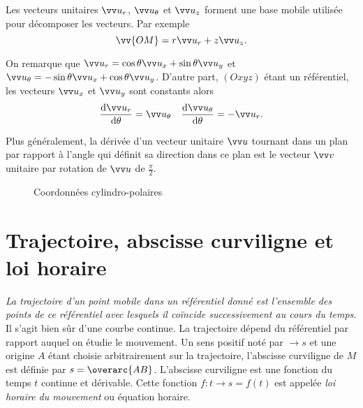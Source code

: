 Les vecteurs unitaires \(\ur\), \(\utheta\) et \(\uz\) forment une base mobile 
utilisée pour décomposer les vecteurs. Par exemple
\begin{equation}%
  \vv{OM}=r \ur + z\uz.%
\end{equation}%

On remarque que \(\ur = \cos \theta \ux + \sin \theta \uy\) et \(\utheta = 
-\sin \theta \ux + \cos \theta \uy\). D'autre part, \((Oxyz)\) étant un 
référentiel, les vecteurs \(\ux\) et \(\uy\) sont constants alors
\begin{equation}%
  \derived{\ur}{\theta} = \utheta \quad \derived{\utheta}{\theta} = -\ur.%
\end{equation}%

Plus généralement, la dérivée d'un vecteur unitaire \(\vu\) tournant dans un 
plan par rapport à l'angle qui définit sa direction dans ce plan est le vecteur 
\(\vvv\) unitaire par rotation de \(\vu\) de \(\frac{\pi}{2}\).

 \begin{figure}%
   \centering
   \caption{Coordonnées cylindro-polaires}\label{fig:coordonnees}%
 \end{figure}%

\section{Trajectoire, abscisse curviligne et loi horaire}%
\label{chap1-sec:trajectoireabcissecurv}%

\emph{La trajectoire d'un point mobile dans un référentiel donné est 
l'ensemble des points de ce référentiel avec lesquels il coïncide 
successivement au cours du temps}. Il s'agit bien sûr d'une courbe continue. 
La trajectoire dépend du référentiel par rapport auquel on étudie le 
mouvement. Un sens positif noté par \(\rightarrow s\) et une origine \(A\) 
étant choisie arbitrairement sur la trajectoire, l'abscisse curviligne de 
\(M\) est définie par \(s=\overarc{AB}\). 
L'abscisse curviligne est une fonction du temps \(t\) continue et dérivable. 
Cette fonction \(f:t \rightarrow s=f(t)\) est appelée \emph{loi horaire du 
mouvement} ou équation horaire.

